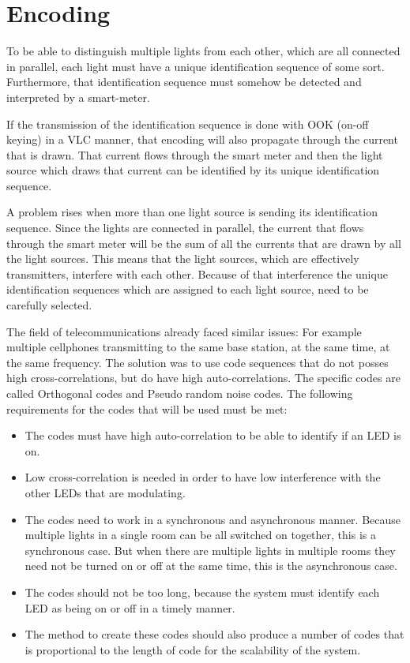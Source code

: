 	\section{Encoding}

	To be able to distinguish multiple lights from each other, which are all connected in parallel, each light must have a unique identification sequence of some sort.
	Furthermore, that identification sequence must somehow be detected and interpreted by a smart-meter.


	If the transmission of the identification sequence is done with OOK (on-off keying) in a VLC manner, that encoding will also propagate through the current that is drawn.
	That current flows through the smart meter and then the light source which draws that current can be identified by its unique identification sequence. 


	A problem rises when more than one light source is sending its identification sequence.
	Since the lights are connected in parallel, the current that flows through the smart meter will be the sum of all the currents that are drawn by all the light sources.
	This means that the light sources, which are effectively transmitters, interfere with each other.
	Because of that interference the unique identification sequences which are assigned to each light source, need to be carefully selected.


	The field of telecommunications already faced similar issues: For example multiple cellphones transmitting to the same base station, at the same time, at the same frequency. 
	The solution was to use code sequences that do not posses high cross-correlations, but do have high auto-correlations.
	The specific codes are called Orthogonal codes and Pseudo random noise codes.
	The following requirements for the codes that will be used must be met:
	\begin{itemize}
		\item The codes must have high auto-correlation to be able to identify if an LED is on.

		\item Low cross-correlation is needed in order to have low interference with the other LEDs that are modulating.

		\item The codes need to work in a synchronous and asynchronous manner. Because multiple lights in a single room can be all switched on together, this is a synchronous case.	But when there are multiple lights in multiple rooms they need not be turned on or off at the same time, this is the asynchronous case.

		\item The codes should not be too long, because the system must identify each LED as being on or off in a timely manner.

		\item The method to create these codes should also produce a number of codes that is proportional to the length of code for the scalability of the system.
	\end{itemize}
	

